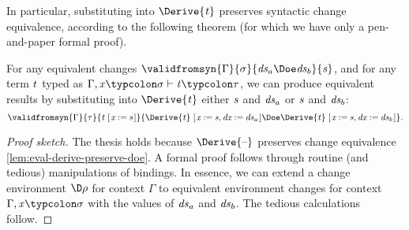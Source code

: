 In particular, substituting into \ensuremath{\Derive{\Varid{t}}} preserves syntactic
change equivalence, according to the following theorem (for which
we have only a pen-and-paper formal proof).
\begin{theorem}
  \label{thm:derive-preserve-doe}
  For any equivalent changes \ensuremath{\validfromsyn{\Gamma}{\sigma}{\Varid{ds}_a\Doe\Varid{ds}_b}{\Varid{s}}}, and for any term \ensuremath{\Varid{t}} typed as
  \ensuremath{\Gamma,\Varid{x}\typcolon\sigma\vdash\Varid{t}\typcolon\tau},
  we can produce equivalent results by substituting into \ensuremath{\Derive{\Varid{t}}} either \ensuremath{\Varid{s}} and \ensuremath{\Varid{ds}_a} or \ensuremath{\Varid{s}} and \ensuremath{\Varid{ds}_b}:
\[\ensuremath{\validfromsyn{\Gamma}{\tau}{\Varid{t}\;[\mskip1.5mu \Varid{x}\mathbin{:=}\Varid{s}\mskip1.5mu]}{\Derive{\Varid{t}}\;[\mskip1.5mu \Varid{x}\mathbin{:=}\Varid{s},\Varid{dx}\mathbin{:=}\Varid{ds}_a\mskip1.5mu]\Doe\Derive{\Varid{t}}\;[\mskip1.5mu \Varid{x}\mathbin{:=}\Varid{s},\Varid{dx}\mathbin{:=}\Varid{ds}_b\mskip1.5mu]}}.\]
\end{theorem}
\begin{proof}[Proof sketch]
  The thesis holds because \ensuremath{\Derive{\text{\textendash}}} preserves change equivalence
  \cref{lem:eval-derive-preserve-doe}.
  A formal proof follows through routine (and tedious)
  manipulations of bindings. In essence, we can extend a change environment
  \ensuremath{\D\rho} for context \ensuremath{\Gamma} to
  equivalent environment changes for context \ensuremath{\Gamma,\Varid{x}\typcolon\sigma}
  with the values of \ensuremath{\Varid{ds}_a} and \ensuremath{\Varid{ds}_b}. The tedious calculations
  follow.
\end{proof}

